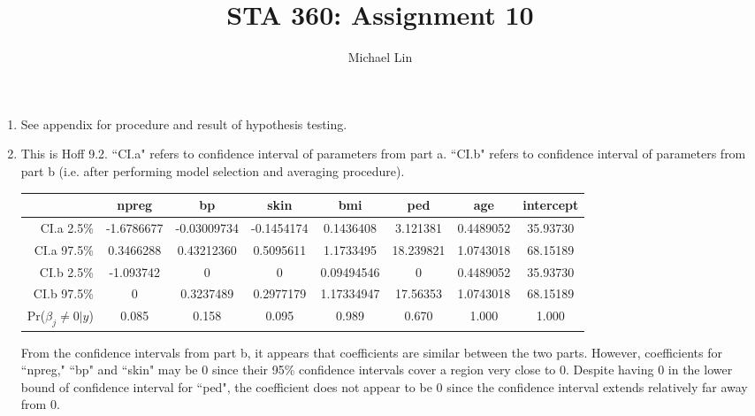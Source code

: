 \documentclass{article}
\title{STA 360: Assignment 10}
\author{Michael Lin}
\begin{document}
\maketitle
\begin{enumerate}
\item See appendix for procedure and result of hypothesis testing.

\item This is Hoff 9.2. ``CI.a" refers to confidence interval of parameters from part a. ``CI.b" refers to confidence interval of parameters from part b (i.e. after performing model selection and averaging procedure).
\begin{center}
\begin{tabular}{r||c|c|c|c|c|c|c}
                          & npreg        & bp        & skin       & bmi       & ped       & age        & intercept \\ \hline 
CI.a 2.5\%                & -1.6786677  & -0.03009734 & -0.1454174 & 0.1436408 & 3.121381  & 0.4489052 & 35.93730\\
CI.a 97.5\%               &  0.3466288  & 0.43212360 & 0.5095611  & 1.1733495 & 18.239821 & 1.0743018  & 68.15189\\ \hline
CI.b 2.5\%                & -1.093742    & 0		 & 0		  & 0.09494546  & 0         & 0.4489052 & 35.93730\\
CI.b 97.5\%               & 0			 & 0.3237489 & 0.2977179  & 1.17334947  & 17.56353  & 1.0743018 & 68.15189  \\ \hline
Pr($\beta_j \neq 0|y$)    & 0.085 & 0.158 & 0.095 & 0.989 & 0.670 & 1.000 & 1.000 \\
\end{tabular}
\end{center}
From the confidence intervals from part b, it appears that coefficients are similar between the two parts. However, coefficients for ``npreg," ``bp" and ``skin" may be 0 since their 95\% confidence intervals cover a region very close to 0. Despite having 0 in the lower bound of confidence interval for ``ped", the coefficient does not appear to be 0 since the confidence interval extends relatively far away from 0.


\end{enumerate}
\end{document}
